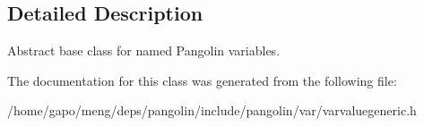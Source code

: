 \subsection{Detailed Description}
Abstract base class for named Pangolin variables. 

The documentation for this class was generated from the following file\+:\begin{DoxyCompactItemize}
\item 
/home/gapo/meng/deps/pangolin/include/pangolin/var/varvaluegeneric.\+h\end{DoxyCompactItemize}
